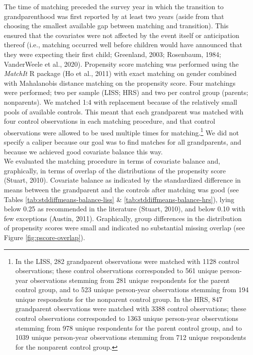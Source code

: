 \documentclass[
  english,
  man,floatsintext]{apa7}
\begin{document}
The time of matching preceded the survey year in which the transition to grandparenthood was first reported by at least two years (aside from that choosing the smallest available gap between matching and transition). This ensured that the covariates were not affected by the event itself or anticipation thereof (i.e., matching occurred well before children would have announced that they were expecting their first child; Greenland, 2003; Rosenbaum, 1984; VanderWeele et al., 2020). Propensity score matching was performed using the \emph{MatchIt} R package (Ho et al., 2011) with exact matching on gender combined with Mahalanobis distance matching on the propensity score. Four matchings were performed; two per sample (LISS; HRS) and two per control group (parents; nonparents). We matched 1:4 with replacement because of the relatively small pools of available controls. This meant that each grandparent was matched with four control observations in each matching procedure, and that control observations were allowed to be used multiple times for matching.\footnote{In the LISS, 282 grandparent observations were matched with 1128 control observations; these control observations corresponded to 561 unique person-year observations stemming from 281 unique respondents for the parent control group, and to 523 unique person-year observations stemming from 194 unique respondents for the nonparent control group. In the HRS, 847 grandparent observations were matched with 3388 control observations; these control observations corresponded to 1363 unique person-year observations stemming from 978 unique respondents for the parent control group, and to 1039 unique person-year observations stemming from 712 unique respondents for the nonparent control group.} We did not specify a caliper because our goal was to find matches for all grandparents, and because we achieved good covariate balance this way.\\
We evaluated the matching procedure in terms of covariate balance and, graphically, in terms of overlap of the distributions of the propensity score (Stuart, 2010). Covariate balance as indicated by the standardized difference in means between the grandparent and the controls after matching was good (see Tables \ref{tab:stddiffmeans-balance-liss} \& \ref{tab:stddiffmeans-balance-hrs}), lying below 0.25 as recommended in the literature (Stuart, 2010), and below 0.10 with few exceptions (Austin, 2011). Graphically, group differences in the distribution of propensity scores were small and indicated no substantial missing overlap (see Figure \ref{fig:pscore-overlap}).\\
\end{document}
